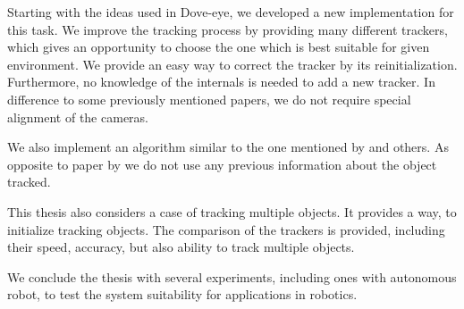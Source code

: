 Starting with the ideas used in Dove-eye, we developed a new implementation for
this task. We improve the tracking process by providing many different
trackers, which gives an opportunity to choose the one which is best suitable for
given environment. We provide an easy way to correct the tracker by its
reinitialization. Furthermore, no knowledge of the internals is needed to add a
new tracker.  In difference to some previously mentioned papers, we do not
require special alignment of the cameras. 

We also implement an algorithm similar to the one mentioned by
\citet*{ibisch2015arbitrary} and others. As opposite to paper by
\citet*{kappeler20103d} we do not use any previous information about the object
tracked.

This thesis also considers a case of tracking multiple objects. It provides a
way, to initialize tracking objects. The comparison of the trackers is
provided, including their speed, accuracy, but also ability to track
multiple objects.

We conclude the thesis with several experiments, including ones with autonomous
robot, to test the system suitability for applications in robotics.
